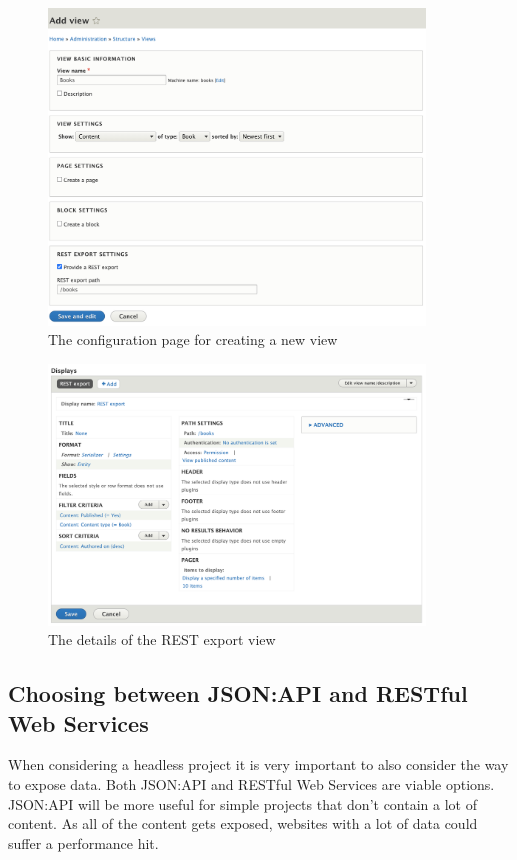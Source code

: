 \begin{figure}[h]
	\centering
	\includegraphics[width=10cm]{./img/View_Create.png}
	\caption[Creating a View]{The configuration page for creating a new view}
\end{figure}

\begin{figure}[h]
	\centering
	\includegraphics[width=10cm]{./img/View_Details.png}
	\caption[Details of a REST export View]{The details of the REST export view}
	\label{fig:RESTView}
\end{figure}

\subsection{Choosing between JSON:API and RESTful Web Services}

When considering a headless project it is very important to also consider the way to expose data. Both JSON:API and RESTful Web Services are viable options. JSON:API will be more useful for simple projects that don't contain a lot of content. As all of the content gets exposed, websites with a lot of data could suffer a performance hit.

